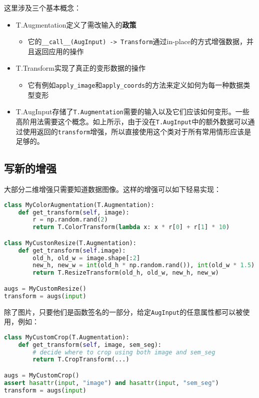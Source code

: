 \documentclass[../main]{subfile}
\begin{document}
这里涉及三个基本概念：
\begin{itemize}
    \item T.Augmentation定义了需改输入的\textbf{政策}
          \begin{itemize}
              \item 它的\lstinline{__call__(AugInput) -> Transform}通过in-place的方式增强数据，并且返回应用的操作
          \end{itemize}
    \item T.Transform实现了真正的变形数据的操作
          \begin{itemize}
              \item 它有例如\lstinline{apply_image}和\lstinline{apply_coords}的方法来定义如何为每一种数据类型变形
          \end{itemize}
    \item T.AugInput存储了\lstinline{T.Augmentation}需要的输入以及它们应该如何变形。一些高阶用法需要这个概念。如上所示，由于没在\lstinline{T.AugInput}中的额外数据可以通过使用返回的\lstinline{transform}增强，所以直接使用这个类对于所有常用情形应该是足够的。
\end{itemize}

\subsection{写新的增强}

大部分二维增强只需要知道数据图像。这样的增强可以如下轻易实现：

\begin{lstlisting}[language=Python]
class MyColorAugmentation(T.Augmentation):
    def get_transform(self, image):
        r = np.random.rand(2)
        return T.ColorTransform(lambda x: x * r[0] + r[1] * 10)

class MyCustonResize(T.Augmentation):
    def get_transform(self.image):
        old_h, old_w = image.shape[:2]
        new_h, new_w = int(old_h * np.random.rand()), int(old_w * 1.5)
        return T.ResizeTransform(old_h, old_w, new_h, new_w)

augs = MyCustomResize()
transform = augs(input)
\end{lstlisting}

除了图片，只要他们是函数签名的一部分，给定\lstinline{AugInput}的任意属性都可以被使用，例如：

\begin{lstlisting}[language=Python]
class MyCustomCrop(T.Augmentation):
    def get_transform(self, image, sem_seg):
        # decide where to crop using both image and sem_seg
        return T.CropTransform(...)

augs = MyCustomCrop()
assert hasattr(input, "image") and hasattr(input, "sem_seg")
transform = augs(input)
\end{lstlisting}
\end{document}
